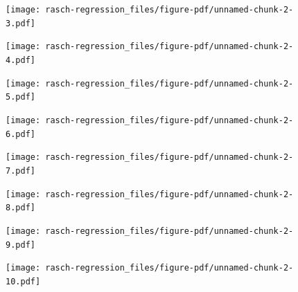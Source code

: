 \documentclass[
  letterpaper,
  DIV=11,
  numbers=noendperiod]{scrreprt}
\begin{document}
\begin{figure}[H]

{\centering \texttt{[image: rasch-regression\_files/figure-pdf/unnamed-chunk-2-3.pdf]}

}

\end{figure}

\begin{figure}[H]

{\centering \texttt{[image: rasch-regression\_files/figure-pdf/unnamed-chunk-2-4.pdf]}

}

\end{figure}

\begin{figure}[H]

{\centering \texttt{[image: rasch-regression\_files/figure-pdf/unnamed-chunk-2-5.pdf]}

}

\end{figure}

\begin{figure}[H]

{\centering \texttt{[image: rasch-regression\_files/figure-pdf/unnamed-chunk-2-6.pdf]}

}

\end{figure}

\begin{figure}[H]

{\centering \texttt{[image: rasch-regression\_files/figure-pdf/unnamed-chunk-2-7.pdf]}

}

\end{figure}

\begin{figure}[H]

{\centering \texttt{[image: rasch-regression\_files/figure-pdf/unnamed-chunk-2-8.pdf]}

}

\end{figure}

\begin{figure}[H]

{\centering \texttt{[image: rasch-regression\_files/figure-pdf/unnamed-chunk-2-9.pdf]}

}

\end{figure}

\begin{figure}[H]

{\centering \texttt{[image: rasch-regression\_files/figure-pdf/unnamed-chunk-2-10.pdf]}

}

\end{figure}
\end{document}
